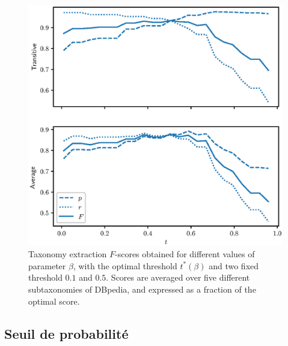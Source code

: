 \begin{figure}
    \centering
    \includegraphics{fig/plot/threshold_exp.eps}
    \caption[Influence du paramètre $t$]{Taxonomy extraction $F$-scores obtained for different values of parameter $\beta$, with the optimal threshold $t^*(\beta)$ and two fixed threshold $0.1$ and $0.5$. Scores are averaged over five different subtaxonomies of DBpedia, and expressed as a fraction of the optimal score.}
    \label{fig:beta-search-2}
\end{figure}

\subsection{Seuil de probabilité}

